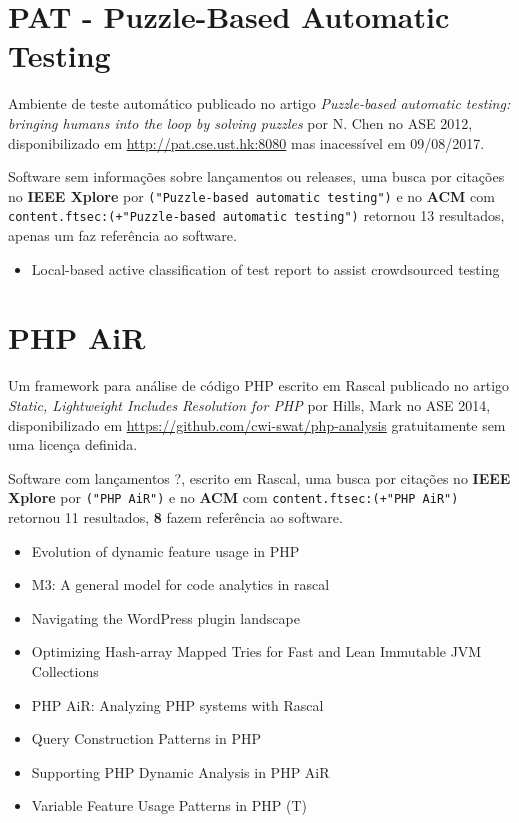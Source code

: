 \section{PAT - Puzzle-Based Automatic Testing}

Ambiente de teste automático
publicado no artigo {\it Puzzle-based automatic testing: bringing humans into the loop by solving puzzles}
por N. Chen
no ASE 2012,
disponibilizado em \url{http://pat.cse.ust.hk:8080}
mas inacessível em 09/08/2017.

Software sem informações sobre lançamentos ou releases,
uma busca por citações no {\bf IEEE Xplore} por
\texttt{("Puzzle-based automatic testing")}
e no {\bf ACM} com
\texttt{content.ftsec:(+"Puzzle-based automatic testing")}
retornou
13 resultados,
apenas um faz referência ao software.

\begin{itemize}
\item Local-based active classification of test report to assist crowdsourced testing
\end{itemize}


\section{PHP AiR}

Um framework para análise de código PHP escrito em Rascal
publicado no artigo {\it Static, Lightweight Includes Resolution for PHP}
por Hills, Mark
no ASE 2014,
disponibilizado em \url{https://github.com/cwi-swat/php-analysis}
gratuitamente
sem uma licença definida.

Software com lançamentos ?,
escrito em Rascal,
uma busca por citações no {\bf IEEE Xplore} por
\texttt{("PHP AiR")}
e no {\bf ACM} com
\texttt{content.ftsec:(+"PHP AiR")}
retornou
11 resultados,
{\bf 8} fazem referência ao software.

\begin{itemize}
\item Evolution of dynamic feature usage in PHP
\item M3: A general model for code analytics in rascal
\item Navigating the WordPress plugin landscape
\item Optimizing Hash-array Mapped Tries for Fast and Lean Immutable JVM Collections
\item PHP AiR: Analyzing PHP systems with Rascal
\item Query Construction Patterns in PHP
\item Supporting PHP Dynamic Analysis in PHP AiR
\item Variable Feature Usage Patterns in PHP (T)
\end{itemize}

